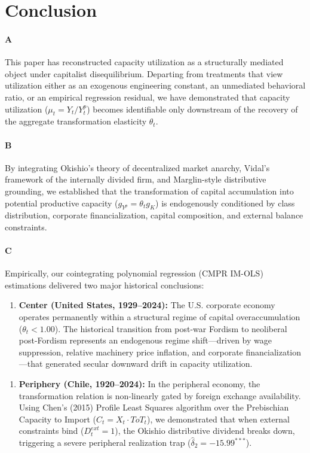 \section{Conclusion}

\paragraph{A}
This paper has reconstructed capacity utilization as a structurally mediated object under capitalist disequilibrium. Departing from treatments that view utilization either as an exogenous engineering constant, an unmediated behavioral ratio, or an empirical regression residual, we have demonstrated that capacity utilization ($\mu_t = Y_t / Y_t^p$) becomes identifiable only downstream of the recovery of the aggregate transformation elasticity $\theta_t$.

\paragraph{B}
By integrating Okishio’s theory of decentralized market anarchy, Vidal’s framework of the internally divided firm, and Marglin-style distributive grounding, we established that the transformation of capital accumulation into potential productive capacity ($g_{Y^p} = \theta_t g_K$) is endogenously conditioned by class distribution, corporate financialization, capital composition, and external balance constraints.

\paragraph{C}
Empirically, our cointegrating polynomial regression (CMPR IM-OLS) estimations delivered two major historical conclusions:

\begin{enumerate}
  \item \textbf{Center (United States, 1929–2024):} The U.S. corporate economy operates permanently within a structural regime of capital overaccumulation ($\theta_t < 1.00$). The historical transition from post-war Fordism to neoliberal post-Fordism represents an endogenous regime shift—driven by wage suppression, relative machinery price inflation, and corporate financialization—that generated secular downward drift in capacity utilization.
\end{enumerate}

\begin{enumerate}
  \item \textbf{Periphery (Chile, 1920–2024):} In the peripheral economy, the transformation relation is non-linearly gated by foreign exchange availability. Using Chen’s (2015) Profile Least Squares algorithm over the Prebischian Capacity to Import ($C_t = X_t \cdot ToT_t$), we demonstrated that when external constraints bind ($D^{ext}_t = 1$), the Okishio distributive dividend breaks down, triggering a severe peripheral realization trap ($\hat{\delta}_2 = -15.99^{***}$).
\end{enumerate}

